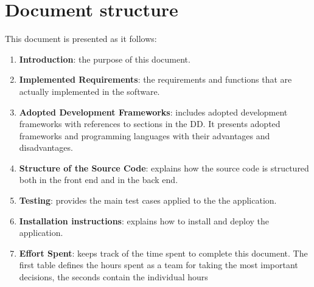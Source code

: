 \section{Document structure}
This document is presented as it follows:
\begin{enumerate}
	\item \textbf{Introduction}: the purpose of this document.

	\item \textbf{Implemented Requirements}: the requirements and functions that are actually implemented in the software.

	\item \textbf{Adopted Development Frameworks}: includes adopted development frameworks with references to sections in the DD. It presents adopted frameworks and programming languages with their advantages and disadvantages.

	\item \textbf{Structure of the Source Code}: explains how the source code is structured both in the front end and in the back end.

    \item \textbf{Testing}: provides the main test cases applied to the the application.
    
    \item \textbf{Installation instructions}: explains how to install and deploy the
    application.

	\item \textbf{Effort Spent}: keeps track of the time spent to complete this document. The first table	defines the hours spent as a team for taking the most important decisions, the seconds	contain the individual hours
\end{enumerate}

